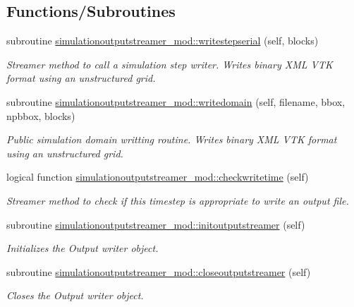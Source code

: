 \subsection*{Functions/\+Subroutines}
\begin{DoxyCompactItemize}
\item 
subroutine \mbox{\hyperlink{namespacesimulationoutputstreamer__mod_ac619e3f6f7ebc099c1e8298460f4f183}{simulationoutputstreamer\+\_\+mod\+::writestepserial}} (self, blocks)
\begin{DoxyCompactList}\small\item\em Streamer method to call a simulation step writer. Writes binary X\+ML V\+TK format using an unstructured grid. \end{DoxyCompactList}\item 
subroutine \mbox{\hyperlink{namespacesimulationoutputstreamer__mod_a2c660b4331c576befebcf037b82b8d7a}{simulationoutputstreamer\+\_\+mod\+::writedomain}} (self, filename, bbox, npbbox, blocks)
\begin{DoxyCompactList}\small\item\em Public simulation domain writting routine. Writes binary X\+ML V\+TK format using an unstructured grid. \end{DoxyCompactList}\item 
logical function \mbox{\hyperlink{namespacesimulationoutputstreamer__mod_a81b788c12b0520901e6fc9b113a10dec}{simulationoutputstreamer\+\_\+mod\+::checkwritetime}} (self)
\begin{DoxyCompactList}\small\item\em Streamer method to check if this timestep is appropriate to write an output file. \end{DoxyCompactList}\item 
subroutine \mbox{\hyperlink{namespacesimulationoutputstreamer__mod_a9ab3e2101fbed18ea896729f7201e1aa}{simulationoutputstreamer\+\_\+mod\+::initoutputstreamer}} (self)
\begin{DoxyCompactList}\small\item\em Initializes the Output writer object. \end{DoxyCompactList}\item 
subroutine \mbox{\hyperlink{namespacesimulationoutputstreamer__mod_adc0f21d337c283eee1f5f13b2eb51d52}{simulationoutputstreamer\+\_\+mod\+::closeoutputstreamer}} (self)
\begin{DoxyCompactList}\small\item\em Closes the Output writer object. \end{DoxyCompactList}\end{DoxyCompactItemize}
